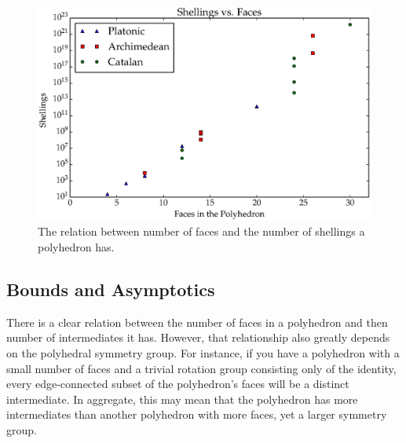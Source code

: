 \begin{figure}[ht]
\includegraphics[scale=0.6, angle=0]{images/polys_face_shellings.eps}
\caption{The relation between number of faces and the number of shellings a polyhedron has.}
\label{fig:FacPathShell}
\end{figure}

\subsection{Bounds and Asymptotics}
There is a clear relation between the number of faces in a polyhedron and then number of intermediates it has. However, that relationship also greatly depends on the polyhedral symmetry group. For instance, if you have a polyhedron with a small number of faces and a trivial rotation group consisting only of the identity, every edge-connected subset of the polyhedron's faces will be a distinct intermediate. In aggregate, this may mean that the polyhedron has more intermediates than another polyhedron with more faces, yet a larger symmetry group. 

